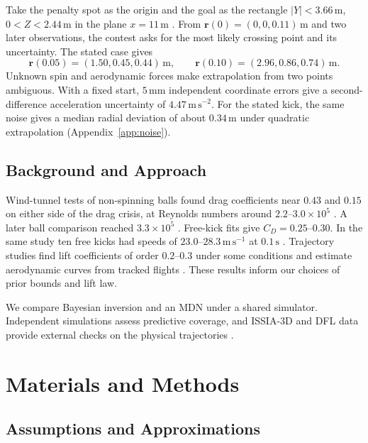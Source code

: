 \documentclass[11pt,a4paper]{article}
\begin{document}
Take the penalty spot as the origin and the goal as the rectangle $|Y|<3.66\,\mathrm{m}$, $0<Z<2.44\,\mathrm{m}$ in the plane $x=11\,\mathrm{m}$ \cite{ifab}. From $\mathbf r(0)=(0,0,0.11)\,\mathrm{m}$ and two later observations, the contest asks for the most likely crossing point and its uncertainty. The stated case gives \cite{upc2026}
\begin{equation}
  \mathbf r(0.05)=(1.50,0.45,0.44)\,\mathrm{m},\qquad
  \mathbf r(0.10)=(2.96,0.86,0.74)\,\mathrm{m}.
  \label{eq:given}
\end{equation}
Unknown spin and aerodynamic forces make extrapolation from two points ambiguous. With a fixed start, $5\,\mathrm{mm}$ independent coordinate errors give a second-difference acceleration uncertainty of $4.47\,\mathrm{m\,s^{-2}}$. For the stated kick, the same noise gives a median radial deviation of about $0.34\,\mathrm{m}$ under quadratic extrapolation (Appendix~\ref{app:noise}).

\subsection{Background and Approach}

Wind-tunnel tests of non-spinning balls found drag coefficients near $0.43$ and $0.15$ on either side of the drag crisis, at Reynolds numbers around $2.2$--$3.0\times10^5$ \cite{asai2007}. A later ball comparison reached $3.3\times10^5$ \cite{asai2013}. Free-kick fits give $C_D=0.25$--$0.30$. In the same study ten free kicks had speeds of $23.0$--$28.3\,\mathrm{m\,s^{-1}}$ at $0.1\,\mathrm{s}$ \cite{bray2003}. Trajectory studies find lift coefficients of order $0.2$--$0.3$ under some conditions and estimate aerodynamic curves from tracked flights \cite{goff2010,goff2017}. These results inform our choices of prior bounds and lift law.

We compare Bayesian inversion and an MDN \cite{bishop1994} under a shared simulator. Independent simulations assess predictive coverage, and ISSIA-3D and DFL data provide external checks on the physical trajectories \cite{soccernetv3d,issia,dfl2025}.

\section{Materials and Methods}
\subsection{Assumptions and Approximations}
\end{document}
